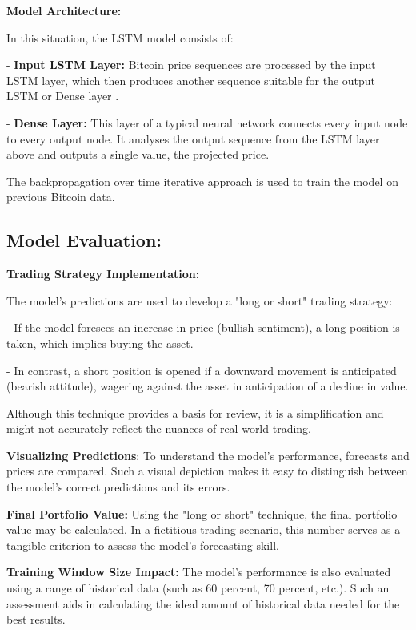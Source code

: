 \textbf{Model Architecture:}

In this situation, the LSTM model consists of:

-	\textbf{Input LSTM Layer:} Bitcoin price sequences are processed by the input LSTM layer, which then produces another sequence suitable for the output LSTM or Dense layer \citep{Hochreiter1997LongSM}.

-	\textbf{Dense Layer:} This layer of a typical neural network connects every input node to every output node. It analyses the output sequence from the LSTM layer above and outputs a single value, the projected price.

The backpropagation over time iterative approach is used to train the model on previous Bitcoin data.

\subsection{Model Evaluation:}

\textbf{Trading Strategy Implementation:}

The model's predictions are used to develop a "long or short" trading strategy:

-	If the model foresees an increase in price (bullish sentiment), a long position is taken, which implies buying the asset.

-	In contrast, a short position is opened if a downward movement is anticipated (bearish attitude), wagering against the asset in anticipation of a decline in value.

Although this technique provides a basis for review, it is a simplification and might not accurately reflect the nuances of real-world trading.

\textbf{Visualizing Predictions}: 
To understand the model's performance, forecasts and prices are compared. Such a visual depiction makes it easy to distinguish between the model's correct predictions and its errors.

\textbf{Final Portfolio Value:} Using the "long or short" technique, the final portfolio value may be calculated. In a fictitious trading scenario, this number serves as a tangible criterion to assess the model's forecasting skill.

\textbf{Training Window Size Impact:} The model's performance is also evaluated using a range of historical data (such as 60 percent, 70 percent, etc.). Such an assessment aids in calculating the ideal amount of historical data needed for the best results.


